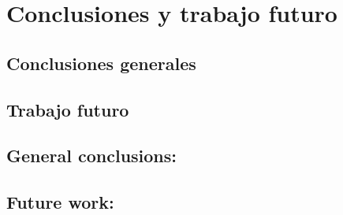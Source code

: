 %
%

\chapter{Conclusiones y trabajo futuro}
\section{Conclusiones generales}
\section{Trabajo futuro}
\section{General conclusions:}
\section{Future work:}
